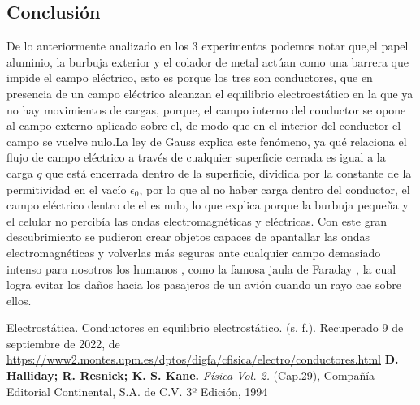 \documentclass[]{article}
\begin{document}
\begin{multicols*}{2}


\section*{Conclusión}
De lo anteriormente analizado en los 3 experimentos podemos notar que,el papel aluminio, la burbuja exterior y el colador de metal actúan como una barrera que impide el campo eléctrico, esto es porque los tres son conductores, que en presencia de un campo eléctrico alcanzan el equilibrio electroestático en la que ya no hay movimientos de cargas, porque, el campo interno del conductor se opone al campo externo aplicado sobre el, de modo que en el interior del conductor el campo se vuelve nulo.La ley de Gauss explica este fenómeno, ya qué relaciona el flujo de campo eléctrico a través de cualquier superficie cerrada es igual a la carga $q$ que está encerrada dentro de la superficie, dividida por la constante de la permitividad en el vacío $\epsilon_0$, por lo que al no haber carga dentro del conductor, el campo eléctrico dentro de el es nulo, lo que explica porque la burbuja pequeña y el celular no percibía las ondas electromagnéticas y eléctricas.
Con este gran descubrimiento se pudieron crear objetos capaces de apantallar las ondas electromagnéticas y volverlas más seguras ante cualquier campo demasiado intenso para nosotros los humanos , como la famosa jaula de Faraday , la cual logra evitar los daños hacia los pasajeros de un avión cuando un rayo cae sobre ellos.


\end{multicols*}



\begin{thebibliography}{5}
      Electrostática. Conductores en equilibrio electrostático. (s. f.). Recuperado 9 de septiembre de 2022, 
    de \url{https://www2.montes.upm.es/dptos/digfa/cfisica/electro/conductores.html}
     \textbf{D. Halliday; R. Resnick; K. S. Kane.} \textit{Física Vol. 2.} (Cap.29), Compañía Editorial Continental, S.A. de C.V. 3º Edición, 1994
\end{thebibliography}
\end{document}
